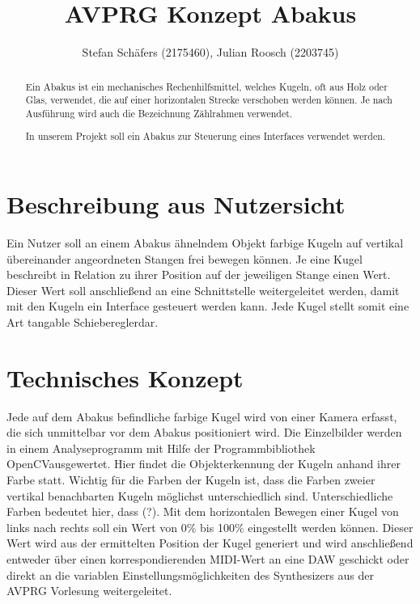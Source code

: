 \documentclass[12pt]{Article}
\title{AVPRG Konzept \glqq Abakus\grqq}
\author{ Stefan Schäfers (2175460), Julian Roosch (2203745)}
\begin{document}
\maketitle
\begin{abstract}
Ein Abakus ist ein mechanisches Rechenhilfsmittel, welches Kugeln, oft aus Holz oder Glas, verwendet, die auf einer horizontalen Strecke verschoben werden können. Je nach Ausführung wird auch die Bezeichnung Zählrahmen verwendet.

In unserem Projekt soll ein Abakus zur Steuerung eines Interfaces verwendet werden.
\end{abstract}
\section{Beschreibung aus Nutzersicht}
Ein Nutzer soll an einem Abakus ähnelndem Objekt farbige Kugeln auf vertikal übereinander angeordneten Stangen frei bewegen können. Je eine Kugel beschreibt in Relation zu ihrer Position auf der jeweiligen Stange einen Wert. Dieser Wert soll anschließend an eine Schnittstelle weitergeleitet werden, damit mit den Kugeln ein Interface gesteuert werden kann. Jede Kugel stellt somit eine Art \glqq tangable Schieberegler\grqq dar.


\section{Technisches Konzept}
Jede auf dem Abakus befindliche farbige Kugel wird von einer Kamera erfasst, die sich unmittelbar vor dem Abakus positioniert wird. Die Einzelbilder werden in einem Analyseprogramm mit Hilfe der Programmbibliothek \glqq OpenCV\grqq ausgewertet. Hier findet die Objekterkennung der Kugeln anhand ihrer Farbe statt. Wichtig für die Farben der Kugeln ist, dass die Farben zweier vertikal benachbarten Kugeln möglichst unterschiedlich sind. Unterschiedliche Farben bedeutet hier, dass (?). Mit dem horizontalen Bewegen einer Kugel von links nach rechts soll ein Wert von 0\% bis 100\% eingestellt werden können. Dieser Wert wird aus der ermittelten Position der Kugel generiert und wird anschließend entweder über einen korrespondierenden MIDI-Wert an eine DAW geschickt oder direkt an die variablen Einstellungsmöglichkeiten des Synthesizers aus der AVPRG Vorlesung weitergeleitet.
\end{document}
